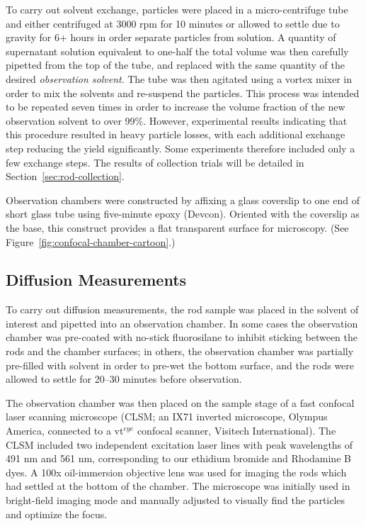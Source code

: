To carry out solvent exchange, particles 
were placed in a micro-centrifuge tube and either centrifuged at 3000 rpm for 10 minutes or
allowed to settle due to gravity for 6+ hours in order separate particles from solution.  A quantity of 
supernatant solution equivalent
to one-half the total volume was then carefully pipetted from the top of the tube, and replaced with the same quantity of 
the desired \textit{observation solvent}.  The tube was then agitated using a vortex mixer in order to mix the solvents and
re-suspend the particles.  This process was intended
to be repeated seven times in order to increase the volume fraction of
the new observation solvent to over 99\%.  However, experimental results indicating that this 
procedure resulted in heavy
particle losses, with each additional exchange step reducing the yield significantly.
Some experiments therefore included only a few exchange steps.  The results of
collection trials will be detailed in 
Section~\ref{sec:rod-collection}.



Observation chambers were constructed by affixing a glass coverslip to one end of short glass tube using 
five-minute epoxy (Devcon).  Oriented with the coverslip as the base, this 
construct provides a flat transparent surface
for microscopy. (See Figure~\ref{fig:confocal-chamber-cartoon}.)


\subsection{Diffusion Measurements}
\label{sec:exp-diffusion}

To carry out diffusion measurements, the rod sample was placed in the solvent of interest and pipetted into an observation 
chamber.  In some cases the observation chamber was pre-coated with no-stick fluorosilane 
to inhibit sticking between the rods and the chamber surfaces; in others,
the observation chamber was partially pre-filled with solvent in order to pre-wet the 
bottom surface, and the rods were allowed to settle for 20--30 minutes before observation.

The observation chamber was then placed on the sample stage of a fast confocal laser scanning microscope (CLSM; 
an IX71 inverted microscope, Olympus America, connected to a vt$^{eye}$ confocal scanner, Visitech International). The CLSM
included two independent excitation laser lines with peak wavelengths of 491 nm and 561 nm, corresponding to our ethidium 
bromide and Rhodamine B dyes.  A 100x oil-immersion objective lens was used for imaging the rods which had settled at the bottom
of the chamber.  The microscope was initially used in bright-field imaging mode and manually adjusted to 
visually find the particles and 
optimize the focus.

